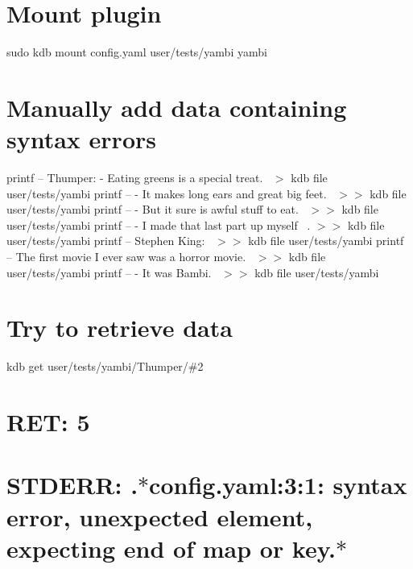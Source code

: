  \hypertarget{autotoc_md753_autotoc_md764}{}\section{Mount plugin}\label{autotoc_md753_autotoc_md764}
sudo kdb mount config.\+yaml user/tests/yambi yambi\hypertarget{autotoc_md753_autotoc_md765}{}\section{Manually add data containing syntax errors}\label{autotoc_md753_autotoc_md765}
printf -- \textquotesingle{}Thumper\+: -\/ Eating greens is a special treat.~\newline
\textquotesingle{} $>$ {\ttfamily kdb file user/tests/yambi} printf -- \textquotesingle{} -\/ It makes long ears and great big feet.~\newline
\textquotesingle{} $>$$>$ {\ttfamily kdb file user/tests/yambi} printf -- \textquotesingle{}-\/ But it sure is awful stuff to eat.~\newline
\textquotesingle{} $>$$>$ {\ttfamily kdb file user/tests/yambi} printf -- \textquotesingle{} -\/ I made that last part up myself~\newline
.\textquotesingle{} $>$$>$ {\ttfamily kdb file user/tests/yambi} printf -- \textquotesingle{}Stephen King\+:~\newline
\textquotesingle{} $>$$>$ {\ttfamily kdb file user/tests/yambi} printf -- \textquotesingle{} The first movie I ever saw was a horror movie.~\newline
\textquotesingle{} $>$$>$ {\ttfamily kdb file user/tests/yambi} printf -- \textquotesingle{} -\/ It was Bambi.~\newline
\textquotesingle{} $>$$>$ {\ttfamily kdb file user/tests/yambi}\hypertarget{autotoc_md753_autotoc_md766}{}\section{Try to retrieve data}\label{autotoc_md753_autotoc_md766}
kdb get user/tests/yambi/\+Thumper/\#2 \hypertarget{autotoc_md753_autotoc_md767}{}\section{R\+E\+T\+: 5}\label{autotoc_md753_autotoc_md767}
\hypertarget{autotoc_md753_autotoc_md768}{}\section{S\+T\+D\+E\+R\+R\+: .$\ast$config.\+yaml\+:3\+:1\+: syntax error, unexpected element, expecting end of map or key.$\ast$}\label{autotoc_md753_autotoc_md768}
